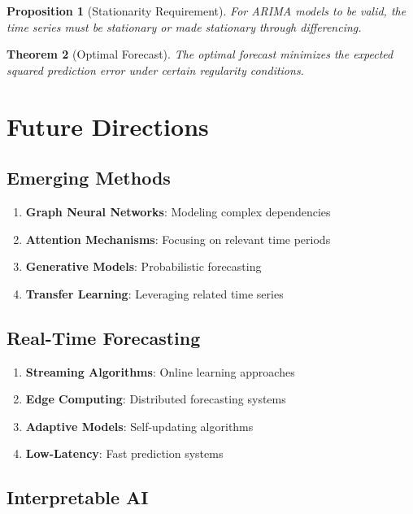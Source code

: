 \documentclass[11pt,a4paper]{article}
\newtheorem{theorem}{Theorem}[section]
\newtheorem{proposition}[theorem]{Proposition}
\begin{document}
\begin{proposition}[Stationarity Requirement]
For ARIMA models to be valid, the time series must be stationary or made stationary through differencing.
\end{proposition}

\begin{theorem}[Optimal Forecast]
The optimal forecast minimizes the expected squared prediction error under certain regularity conditions.
\end{theorem}

\section{Future Directions}

\subsection{Emerging Methods}

\begin{enumerate}
\item \textbf{Graph Neural Networks}: Modeling complex dependencies
\item \textbf{Attention Mechanisms}: Focusing on relevant time periods
\item \textbf{Generative Models}: Probabilistic forecasting
\item \textbf{Transfer Learning}: Leveraging related time series
\end{enumerate}

\subsection{Real-Time Forecasting}

\begin{enumerate}
\item \textbf{Streaming Algorithms}: Online learning approaches
\item \textbf{Edge Computing}: Distributed forecasting systems
\item \textbf{Adaptive Models}: Self-updating algorithms
\item \textbf{Low-Latency}: Fast prediction systems
\end{enumerate}

\subsection{Interpretable AI}
\end{document}
